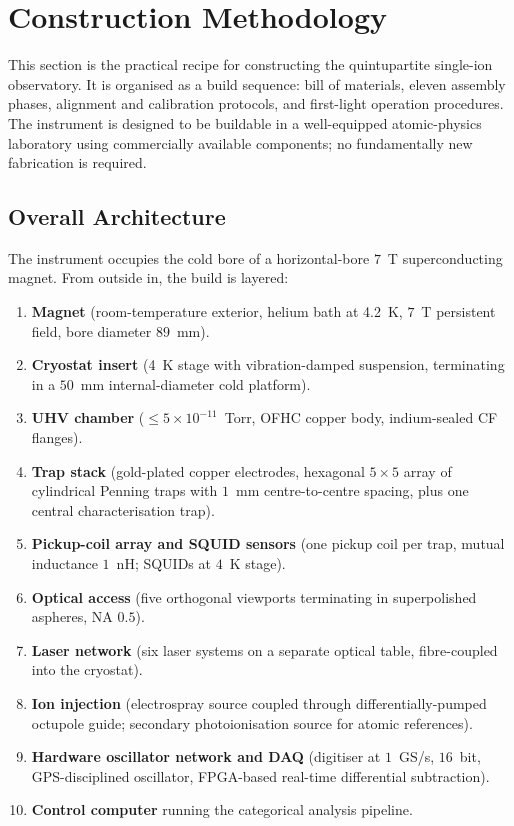 \section{Construction Methodology}
\label{sec:construction_methodology}

This section is the practical recipe for constructing the quintupartite single-ion observatory. It is organised as a build sequence: bill of materials, eleven assembly phases, alignment and calibration protocols, and first-light operation procedures. The instrument is designed to be buildable in a well-equipped atomic-physics laboratory using commercially available components; no fundamentally new fabrication is required.

\subsection{Overall Architecture}
\label{subsec:architecture}

The instrument occupies the cold bore of a horizontal-bore $7$~T superconducting magnet. From outside in, the build is layered:

\begin{enumerate}[leftmargin=1.5em]
    \item \textbf{Magnet} (room-temperature exterior, helium bath at 4.2~K, $7$~T persistent field, bore diameter $89$~mm).
    \item \textbf{Cryostat insert} (4~K stage with vibration-damped suspension, terminating in a $50$~mm internal-diameter cold platform).
    \item \textbf{UHV chamber} ($\le 5\times10^{-11}$~Torr, OFHC copper body, indium-sealed CF flanges).
    \item \textbf{Trap stack} (gold-plated copper electrodes, hexagonal $5\times5$ array of cylindrical Penning traps with $1$~mm centre-to-centre spacing, plus one central characterisation trap).
    \item \textbf{Pickup-coil array and SQUID sensors} (one pickup coil per trap, mutual inductance $1$~nH; SQUIDs at $4$~K stage).
    \item \textbf{Optical access} (five orthogonal viewports terminating in superpolished aspheres, NA $0.5$).
    \item \textbf{Laser network} (six laser systems on a separate optical table, fibre-coupled into the cryostat).
    \item \textbf{Ion injection} (electrospray source coupled through differentially-pumped octupole guide; secondary photoionisation source for atomic references).
    \item \textbf{Hardware oscillator network and DAQ} (digitiser at $1$~GS/s, $16$~bit, GPS-disciplined oscillator, FPGA-based real-time differential subtraction).
    \item \textbf{Control computer} running the categorical analysis pipeline.
\end{enumerate}

